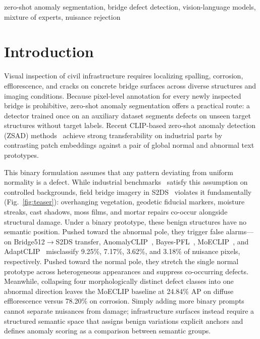 \documentclass[conference]{IEEEtran}
\begin{document}
\begin{IEEEkeywords}
zero-shot anomaly segmentation, bridge defect detection, vision-language models, mixture of experts, nuisance rejection
\end{IEEEkeywords}

\section{Introduction}

Visual inspection of civil infrastructure requires localizing spalling, corrosion, efflorescence, and cracks on concrete bridge surfaces across diverse structures and imaging conditions. Because pixel-level annotation for every newly inspected bridge is prohibitive, zero-shot anomaly segmentation offers a practical route: a detector trained once on an auxiliary dataset segments defects on unseen target structures without target labels. Recent CLIP-based zero-shot anomaly detection (ZSAD) methods~\cite{jeong2023winclip,zhou2024anomalyclip,qu2025bayespfl,gao2026adaptclip,park2026moeclip} achieve strong transferability on industrial parts by contrasting patch embeddings against a pair of global normal and abnormal text prototypes.

This binary formulation assumes that any pattern deviating from uniform normality is a defect. While industrial benchmarks~\cite{bergmann2021mvtec,zou2022visa} satisfy this assumption on controlled backgrounds, field bridge imagery in S2DS~\cite{benz2022s2ds} violates it fundamentally (Fig.~\ref{fig:teaser}): overhanging vegetation, geodetic fiducial markers, moisture streaks, cast shadows, moss films, and mortar repairs co-occur alongside structural damage. Under a binary prototype, these benign structures have no semantic position. Pushed toward the abnormal pole, they trigger false alarms---on Bridge512$\rightarrow$S2DS transfer, AnomalyCLIP~\cite{zhou2024anomalyclip}, Bayes-PFL~\cite{qu2025bayespfl}, MoECLIP~\cite{park2026moeclip}, and AdaptCLIP~\cite{gao2026adaptclip} misclassify 9.25\%, 7.17\%, 3.62\%, and 3.18\% of nuisance pixels, respectively. Pushed toward the normal pole, they stretch the single normal prototype across heterogeneous appearances and suppress co-occurring defects. Meanwhile, collapsing four morphologically distinct defect classes into one abnormal direction leaves the MoECLIP baseline at 24.84\% AP on diffuse efflorescence versus 78.20\% on corrosion. Simply adding more binary prompts cannot separate nuisances from damage; infrastructure surfaces instead require a structured semantic space that assigns benign variations explicit anchors and defines anomaly scoring as a comparison between semantic groups.
\end{document}
